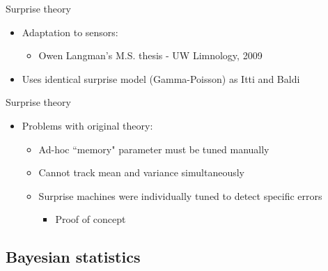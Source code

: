 \documentclass{beamer}
\begin{document}
\begin{frame}{Surprise theory}
	\begin{itemize}
		\item Adaptation to sensors:
		\begin{itemize}
			\item Owen Langman's M.S. thesis - UW Limnology, 2009
		\end{itemize}
		\item Uses identical surprise model (Gamma-Poisson) as Itti and Baldi
	\end{itemize}
\end{frame}


\begin{frame}{Surprise theory}
	\begin{itemize}
		\item Problems with original theory:
		\begin{itemize}
			\item Ad-hoc ``memory" parameter must be tuned manually
			\item Cannot track mean and variance simultaneously
			\item Surprise machines were individually tuned to detect specific errors
			\begin{itemize}
				\item Proof of concept
			\end{itemize}
		\end{itemize}
	\end{itemize}
\end{frame}


\subsection{Bayesian statistics}
\end{document}
